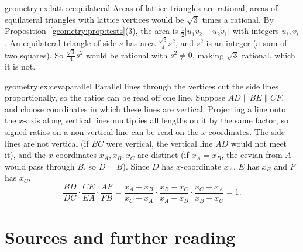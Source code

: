 \begin{solution}{geometry:ex:latticeequilateral}
\idea Areas of lattice triangles are rational, areas of equilateral triangles with lattice vertices would be $\sqrt3$ times a rational.
\writeup By Proposition~\ref{geometry:prop:tests}(3), the area is $\frac12|u_1v_2-u_2v_1|$ with integers $u_i,v_i$. An equilateral triangle of side $s$ has
area $\frac{\sqrt3}4s^2$, and $s^2$ is an integer (a sum of two squares). So $\frac{\sqrt3}4s^2$ would be rational with $s^2\ne0$, making $\sqrt3$
rational, which it is not.
\end{solution}

\begin{solution}{geometry:ex:cevaparallel}
\idea Parallel lines through the vertices cut the side lines proportionally, so the ratios can be read off one line.
\writeup Suppose $AD\parallel BE\parallel CF$, and choose coordinates in which these lines are vertical. Projecting a line onto the $x$-axis
along vertical lines multiplies all lengths on it by the same factor, so signed ratios on a non-vertical line can be read on the
$x$-coordinates. The side lines are not vertical (if $BC$ were vertical, the vertical line $AD$ would not meet it), and the
$x$-coordinates $x_A,x_B,x_C$ are distinct (if $x_A=x_B$, the cevian from $A$ would pass through $B$, so $D=B$). Since $D$ has
$x$-coordinate $x_A$, $E$ has $x_B$ and $F$ has $x_C$,
\[
\frac{BD}{DC}\cdot\frac{CE}{EA}\cdot\frac{AF}{FB}=\frac{x_A-x_B}{x_C-x_A}\cdot\frac{x_B-x_C}{x_A-x_B}\cdot\frac{x_C-x_A}{x_B-x_C}=1.
\]
\end{solution}

\section*{Sources and further reading}

